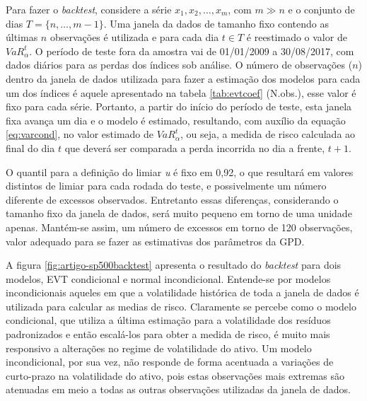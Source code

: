 \documentclass[1p]{elsarticle}
\theoremstyle{definition}
\begin{document}
Para fazer o \emph{backtest}, considere a série $x_1, x_2, \ldots, x_m$, com $m\gg n$ e o conjunto de dias $T = \{n, \ldots, m-1\}$. Uma janela da dados de tamanho fixo contendo as últimas $n$ observações é utilizada e para cada dia $t \in T$ é reestimado o valor de $VaR^t_\alpha$. O período de teste fora da amostra vai de 01/01/2009 a 30/08/2017, com dados diários para as perdas dos índices sob análise. O número de observações ($n$) dentro da janela de dados utilizada para fazer a estimação dos modelos para cada um dos índices é aquele apresentado na tabela \ref{tab:evtcoef} (N.obs.), esse valor é fixo para cada série. Portanto, a partir do início do período de teste, esta janela fixa avança um dia e o modelo é estimado, resultando, com auxílio da equação \eqref{eq:varcond}, no valor estimado de $VaR_\alpha^t$, ou seja, a medida de risco calculada ao final do dia $t$ que deverá ser comparada a perda incorrida no dia a frente, $t+1$.

O quantil para a definição do limiar \emph{u} é fixo em 0,92, o que resultará em valores distintos de limiar para cada rodada do teste, e possivelmente um número diferente de excessos observados. Entretanto essas diferenças, considerando o tamanho fixo da janela de dados, será muito pequeno em torno de uma unidade apenas. Mantém-se assim, um número de excessos em torno de 120 observações, valor adequado para se fazer as estimativas dos parâmetros da GPD.

A figura \ref{fig:artigo-sp500backtest} apresenta o resultado do \emph{backtest} para dois modelos, EVT condicional e normal incondicional. Entende-se por modelos incondicionais aqueles em que a volatilidade histórica de toda a janela de dados é utilizada para calcular as medias de risco. Claramente se percebe como o modelo condicional, que utiliza a última estimação para a volatilidade dos resíduos padronizados e então escalá-los para obter a medida de risco, é muito mais responsivo a alterações no regime de volatilidade do ativo. Um modelo incondicional, por sua vez, não responde de forma acentuada a variações de curto-prazo na volatilidade do ativo, pois estas observações mais extremas são atenuadas em meio a todas as outras observações utilizadas da janela de dados.
\end{document}
